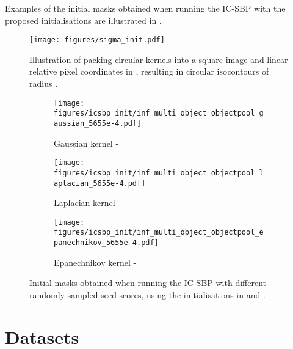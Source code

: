 \documentclass{article}
\begin{document}
Examples of the initial masks obtained when running the IC-SBP with the proposed initialisations are illustrated in .
\begin{figure}[h!]
    \begin{minipage}[b]{0.45\linewidth}
    	\centering
    	\texttt{[image: figures/sigma\_init.pdf]}
    	\vspace{25pt}
    	\caption{Illustration of packing  circular kernels into a square image and linear relative pixel coordinates in , resulting in circular isocontours of radius .}
    	\label{fig:gpp:sigma_init}
	\end{minipage}
    \quad
    \begin{minipage}[b]{0.45\linewidth}
    	\centering
    	\begin{subfigure}{\linewidth}
    		\texttt{[image: figures/icsbp\_init/inf\_multi\_object\_objectpool\_gaussian\_5655e-4.pdf]}
    		\caption{Gaussian kernel - }
    		\vspace{6pt}
    	\end{subfigure}
    	\begin{subfigure}{\linewidth}
    		\texttt{[image: figures/icsbp\_init/inf\_multi\_object\_objectpool\_laplacian\_5655e-4.pdf]}
    		\caption{Laplacian kernel - }
    		\vspace{6pt}
    	\end{subfigure}
    	\begin{subfigure}{\linewidth}
    		\texttt{[image: figures/icsbp\_init/inf\_multi\_object\_objectpool\_epanechnikov\_5655e-4.pdf]}
    		\caption{Epanechnikov kernel - }
    		\vspace{6pt}
    	\end{subfigure}
    	\caption{Initial masks obtained when running the IC-SBP with different randomly sampled seed scores, using the initialisations in  and .}
    	\label{fig:gpp:icsbp_init}
    	\vspace{1pt}
	\end{minipage}
\end{figure}


\section{Datasets}
\label{app:datasets}
\end{document}
